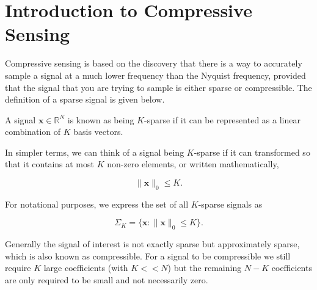 
\section{Introduction to Compressive Sensing}
\label{sec:intro_cs}



Compressive sensing \citep{Candes2006, Candes2006a, Donoho2006} is  based on the discovery that there is a way to accurately sample a signal at a much lower frequency than the Nyquist frequency, provided that the signal that you are trying to sample is either sparse or compressible.
The definition of a sparse signal is given below.



\begin{mydef}
  A signal $\boldsymbol{x} \in \mathbb{R}^{N}$ is known as being $K$-sparse if it can be represented as a linear combination of $K$ basis vectors.  
 \end{mydef}

In simpler terms, we can think of a signal being $K$-sparse if it can transformed so that it contains at most $K$ non-zero elements, or written mathematically,  

 \begin{equation*}
    \label{eq:100}
\|\boldsymbol{x}\|_{0} \leq K .   
  \end{equation*}

For notational purposes, we express the set of all $K$-sparse signals as 

\begin{equation*}
  \label{eq:21}
  \Sigma_{K} = \{\boldsymbol{x}:\|\boldsymbol{x}\|_{0} \leq K\}. 
\end{equation*}

Generally the signal of interest is not exactly sparse but approximately sparse, which is also known as compressible. For a signal to be compressible we still require $K$ large coefficients (with $K << N$) but the remaining $N-K$ coefficients are only required to be small and not necessarily zero.

